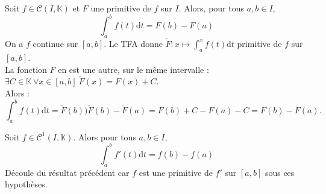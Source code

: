 \documentclass[11pt]{article}
\newcommand*{\K}{\mathbb{K}}
\newcommand*{\m}{\mathcal}
\newcommand{\0}{\varnothing}
\newcommand{\dt}{\textrm{d}t}
\begin{document}
\begin{prop}{}{}
    Soit $f\in\m{C}(I,\K)$ et $F$ une primitive de $f$ sur $I$. Alors, pour tous $a,b\in I$,
    \begin{equation*}
        \int_a^bf(t)\dt=F(b)-F(a)
    \end{equation*}
    \tcblower
    On a $f$ continue sur $[a,b]$. Le TFA donne $\tilde{F}:x\mapsto\int_a^xf(t)\dt$ primitive de $f$ sur $[a,b]$.\\
    La fonction $F$ en est une autre, sur le même intervalle : $\exists C\in\K ~ \forall x \in [a,b] ~ \tilde{F}(x)=F(x)+C$.\\
    Alors :
    \begin{equation*}
        \int_a^bf(t)\dt=\tilde{F}(b))\tilde{F}(b)-\tilde{F}(a)=F(b)+C-F(a)-C=F(b)-F(a).
    \end{equation*}
\end{prop}

\begin{prop}{}{}
    Soit $f\in\m{C}^1(I,\K)$. Alors pour tous $a,b\in I$,
    \begin{equation*}
        \int_a^bf'(t)\dt=f(b)-f(a)
    \end{equation*}
    \tcblower
    Découle du résultat précédent car $f$ est une primitive de $f'$ sur $[a,b]$ sous ces hypothèses.
\end{prop}
\end{document}
